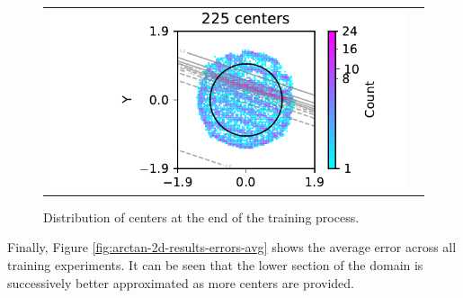 \documentclass[12pt]{report} %
\begin{document}
\begin{figure}
\begin{tabular}{cc}
    \includegraphics[width=.6\textwidth]{imagenes/experiments/2d/statistical_2d_full_scheduler_interpolation/arctan_2d/circle_c225_arctan_paper_2d_gaussian_kernel.pdf}
  \end{tabular}
  \caption{Distribution of centers at the end of the training process.}
  \label{fig:arctan-2d-results-centers}
\end{figure}

Finally, Figure \ref{fig:arctan-2d-results-errors-avg} shows the average error across all training experiments. It can be seen that the lower section of the domain is successively better approximated as more centers are provided.
\end{document}
